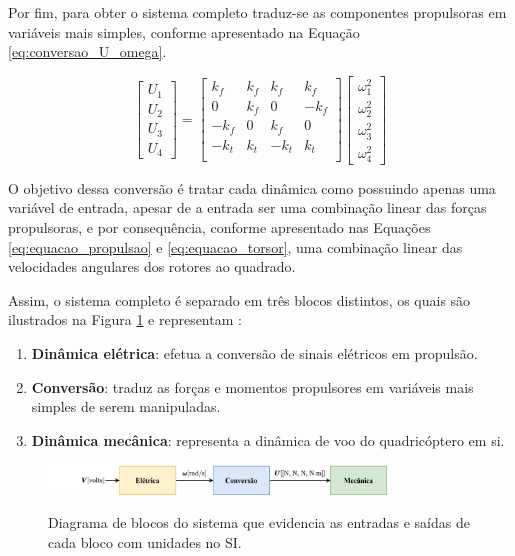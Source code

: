 \documentclass[main.tex]{subfiles}
\begin{document}
Por fim, para obter o sistema completo traduz-se as componentes propulsoras em variáveis mais simples, conforme apresentado na Equação \ref{eq:conversao_U_omega}.

\begin{equation}\label{eq:conversao_U_omega}
	\begin{bmatrix}
		U_1\\
		U_2\\
		U_3\\
		U_4
	\end{bmatrix} = 
	\begin{bmatrix}
		k_f		& k_f 	& k_f 	& k_f\\
		0 		& k_f 	& 0 	& -k_f\\
		-k_f	& 0		& k_f	& 0\\
		-k_t 	& k_t 	& -k_t 	& k_t\\
	\end{bmatrix}
	\begin{bmatrix}
		\omega_1^2\\
		\omega_2^2\\
		\omega_3^2\\
		\omega_4^2
	\end{bmatrix}
\end{equation}

O objetivo dessa conversão é tratar cada dinâmica como possuindo apenas uma variável de entrada, apesar de a entrada ser uma combinação linear das forças propulsoras, e por consequência, conforme apresentado nas Equações \ref{eq:equacao_propulsao} e \ref{eq:equacao_torsor}, uma combinação linear das velocidades angulares dos rotores ao quadrado.


Assim, o sistema completo é separado em três blocos distintos, os quais são ilustrados na Figura \ref{fig:diagrama_blocos_final} e representam :
\begin{enumerate}
	\item \textbf{Dinâmica elétrica}: efetua a conversão de sinais elétricos em propulsão.
	\item \textbf{Conversão}: traduz as forças e momentos propulsores em variáveis mais simples de serem manipuladas.
	\item \textbf{Dinâmica mecânica}: representa a dinâmica de voo do quadricóptero em si.
\end{enumerate} 

\begin{figure}[!h]
	\centering
	\caption{Diagrama de blocos do sistema que evidencia as entradas e saídas de cada bloco com unidades no SI.}
	\includegraphics[width=0.8\textwidth]{capitulos/modelagem/imgs/diagrama_blocos_final.png}
	\label{fig:diagrama_blocos_final}
\end{figure}
\end{document}
